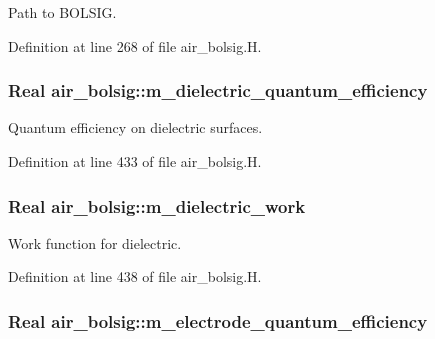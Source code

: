 Path to B\+O\+L\+S\+IG. 



Definition at line 268 of file air\+\_\+bolsig.\+H.

\subsubsection[{\texorpdfstring{m\+\_\+dielectric\+\_\+quantum\+\_\+efficiency}{m_dielectric_quantum_efficiency}}]{\setlength{\rightskip}{0pt plus 5cm}Real air\+\_\+bolsig\+::m\+\_\+dielectric\+\_\+quantum\+\_\+efficiency\hspace{0.3cm}{\ttfamily [protected]}}\hypertarget{classair__bolsig_a0e11589882b9910a65bc4847cccbaca4}{}\label{classair__bolsig_a0e11589882b9910a65bc4847cccbaca4}


Quantum efficiency on dielectric surfaces. 



Definition at line 433 of file air\+\_\+bolsig.\+H.

\subsubsection[{\texorpdfstring{m\+\_\+dielectric\+\_\+work}{m_dielectric_work}}]{\setlength{\rightskip}{0pt plus 5cm}Real air\+\_\+bolsig\+::m\+\_\+dielectric\+\_\+work\hspace{0.3cm}{\ttfamily [protected]}}\hypertarget{classair__bolsig_ab994b1243b63cf1cec12d8aed042d494}{}\label{classair__bolsig_ab994b1243b63cf1cec12d8aed042d494}


Work function for dielectric. 



Definition at line 438 of file air\+\_\+bolsig.\+H.

\subsubsection[{\texorpdfstring{m\+\_\+electrode\+\_\+quantum\+\_\+efficiency}{m_electrode_quantum_efficiency}}]{\setlength{\rightskip}{0pt plus 5cm}Real air\+\_\+bolsig\+::m\+\_\+electrode\+\_\+quantum\+\_\+efficiency\hspace{0.3cm}{\ttfamily [protected]}}\hypertarget{classair__bolsig_ad84a1665143e64c70ceecd5531040345}{}\label{classair__bolsig_ad84a1665143e64c70ceecd5531040345}



